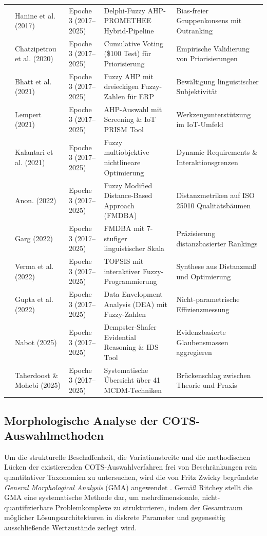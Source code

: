 \begin{longtable}{p{} p{} p{} p{} p{}}
\cite{NZJEEPAC} & Hanine et al. (2017) & Epoche 3 (2017--2025) & Delphi-Fuzzy AHP-PROMETHEE Hybrid-Pipeline & Bias-freier Gruppenkonsens mit Outranking \\
\cite{UK2X9C4W} & Chatzipetrou et al. (2020) & Epoche 3 (2017--2025) & Cumulative Voting (\$100 Test) für Priorisierung & Empirische Validierung von Priorisierungen \\
\cite{5BBYQCJB} & Bhatt et al. (2021) & Epoche 3 (2017--2025) & Fuzzy AHP mit dreieckigen Fuzzy-Zahlen für ERP & Bewältigung linguistischer Subjektivität \\
\cite{RRU375GB} & Lempert (2021) & Epoche 3 (2017--2025) & AHP-Auswahl mit Screening \& IoT PRISM Tool & Werkzeugunterstützung im IoT-Umfeld \\
\cite{UFCEV52H} & Kalantari et al. (2021) & Epoche 3 (2017--2025) & Fuzzy multiobjektive nichtlineare Optimierung & Dynamic Requirements \& Interaktionsgrenzen \\
\cite{9BLXY3EP} & Anon. (2022) & Epoche 3 (2017--2025) & Fuzzy Modified Distance-Based Approach (FMDBA) & Distanzmetriken auf ISO 25010 Qualitätsbäumen \\
\cite{FVINCQ89} & Garg (2022) & Epoche 3 (2017--2025) & FMDBA mit 7-stufiger linguistischer Skala & Präzisierung distanzbasierter Rankings \\
\cite{8KF4HAZS} & Verma et al. (2022) & Epoche 3 (2017--2025) & TOPSIS mit interaktiver Fuzzy-Programmierung & Synthese aus Distanzmaß und Optimierung \\
\cite{YVWGHAWQ} & Gupta et al. (2022) & Epoche 3 (2017--2025) & Data Envelopment Analysis (DEA) mit Fuzzy-Zahlen & Nicht-parametrische Effizienzmessung \\
\cite{LNQHES84} & Nabot (2025) & Epoche 3 (2017--2025) & Dempster-Shafer Evidential Reasoning \& IDS Tool & Evidenzbasierte Glaubensmassen aggregieren \\
\cite{LPC92LAP} & Taherdoost \& Mohebi (2025) & Epoche 3 (2017--2025) & Systematische Übersicht über 41 MCDM-Techniken & Brückenschlag zwischen Theorie und Praxis \\
\end{longtable}

\subsection{Morphologische Analyse der COTS-Auswahlmethoden}
\label{subsec:morphologische_analyse}

Um die strukturelle Beschaffenheit, die Variationsbreite und die methodischen Lücken der existierenden COTS-Auswahlverfahren frei von Beschränkungen rein quantitativer Taxonomien zu untersuchen, wird die von Fritz Zwicky begründete \textit{General Morphological Analysis} (GMA) angewendet \cite{Z6N6V5L9}. Gemäß Ritchey stellt die GMA eine systematische Methode dar, um mehrdimensionale, nicht-quantifizierbare Problemkomplexe zu strukturieren, indem der Gesamtraum möglicher Lösungsarchitekturen in diskrete Parameter und gegenseitig ausschließende Wertzustände zerlegt wird.

